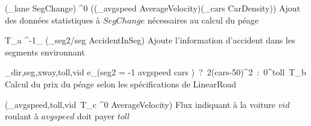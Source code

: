 	{(\sigma_{lane } SegChange) \lojoin^{0} ((\sigma_{avgspeed } AverageVelocity)\Join (\sigma_{cars } CarDensity))}
	{Ajout des données statistiques à $SegChange$ nécessaires au calcul du péage}

	{T_a \lojoin^{-1}_{} (\rho_{seg2/seg} AccidentInSeg)}
	{Ajoute l'information d'accident dans les segments environnant}

	{\Pi_{dir,seg,xway,toll,vid} e_{(seg2 = -1 \wedge avgspeed  \wedge cars )\ ?\ 2(cars-50)^2\ :\ 0}^{toll}\ T_b}
	{Calcul du prix du péage selon les spécifications de LinearRoad}

	{\RSu(\Pi_{avgspeed,toll,vid}\ T_c \lojoin^{0} AverageVelocity)}
	{Flux indiquant à la voiture $vid$ roulant à $avgspeed$ doit payer $toll$}